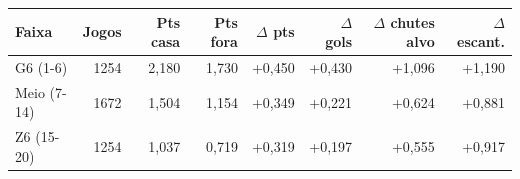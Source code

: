 \begin{tabular}{lrrrrrrr}
  \toprule
  Faixa & Jogos & Pts casa & Pts fora & $\Delta$ pts & $\Delta$ gols & $\Delta$ chutes alvo & $\Delta$ escant. \\
  \midrule
  G6 (1-6) & 1254 & 2,180 & 1,730 & +0,450 & +0,430 & +1,096 & +1,190 \\
  Meio (7-14) & 1672 & 1,504 & 1,154 & +0,349 & +0,221 & +0,624 & +0,881 \\
  Z6 (15-20) & 1254 & 1,037 & 0,719 & +0,319 & +0,197 & +0,555 & +0,917 \\
  \bottomrule
\end{tabular}
